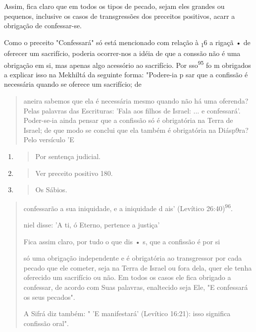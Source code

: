 Assim, fica claro que em todos os tipos de pecado, sejam eles gran­des
ou pequenos, inclusive os casos de transgressões dos preceitos
positivos, acarr a obrigação de confessar-se.

Como o preceito "Confessará" só está mencionado com relação à
\textsubscript{1}6 a rigaçã • de oferecer um sacrifício, poderia
ocorrer-nos a idéia de que a con­ssão não é uma obrigação em si, mas
apenas algo acessório ao sacrifício. Por sso\textsuperscript{95} fo m
obrigados a explicar isso na Mekhiltá da seguinte forma: "Poder­e-ia p
sar que a confissão é necessária quando se oferece um sacrifício; de

\begin{quote}
aneira sabemos que ela é necessária mesmo quando não há uma oferen­da?
Pelas palavras das Escrituras: 'Fala aos filhos de Israel: ... e
confessará'. Poder-se-ia ainda pensar que a confissão só é obrigatória
na Terra de Israel; de que modo se conclui que ela também é obrigatória
na Diásp9ra? Pelo versículo 'E
\end{quote}

\begin{enumerate}
\def\labelenumi{\arabic{enumi}.}
\setcounter{enumi}{92}
\item
 \begin{quote}
 Por sentença judicial.
 \end{quote}
\item
 \begin{quote}
 Ver preceito positivo 180.
 \end{quote}
\item
 \begin{quote}
 Os Sábios.
 \end{quote}
\end{enumerate}

\begin{quote}confessarão a sua iniquidade, e a iniquidade d ais' (Levítico
26:40)\textsuperscript{96}.

niel disse: 'A ti, ó Eterno, pertence a justiça'

Fica assim claro, por tudo o que dis • s, que a confissão é por si

só uma obrigação independente e é obrigatória ao transgressor por cada
peca­do que ele cometer, seja na Terra de Israel ou fora dela, quer ele
tenha ofereci­do um sacrifício ou não. Em todos os casos ele fica
obrigado a confessar, de acordo com Suas palavras, enaltecido seja Ele,
"E confessará os seus pecados".

A Sifrá diz também: " 'E manifestará' (Levítico 16:21): isso significa
confissão oral".
\end{quote}

